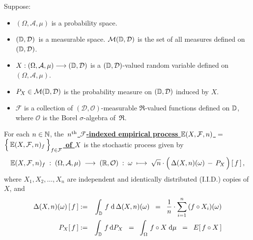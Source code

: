 \begin{definition}
\mbox{}\vskip 0.1cm
\noindent
Suppose:
\begin{itemize}
\item
	$(\Omega,\mathcal{A},\mu)$ is a probability space.
\item
	$(\mathbb{D},\mathcal{D})$\, is a measurable space.
	$\mathcal{M}(\mathbb{D},\mathcal{D})$ is the set of all measures defined on $(\mathbb{D},\mathcal{D})$.
\item
	$X : (\Omega,\mathcal{A},\mu) \longrightarrow (\mathbb{D},\mathcal{D})$
	is a $(\mathbb{D},\mathcal{D})$-valued random variable defined on
	$(\Omega,\mathcal{A},\mu)$.
\item
	$P_{X} \in \mathcal{M}(\mathbb{D},\mathcal{D})$ is the probability measure
	on $(\mathbb{D},\mathcal{D})$ induced by $X$.
\item
	$\mathcal{F}$ is a collection of $(\mathcal{D},\mathcal{O})$-measurable $\Re$-valued functions
	defined on $\mathbb{D}$, where $\mathcal{O}$ is the Borel $\sigma$-algebra of \,$\Re$.
\end{itemize}
For each $n\in\mathbb{N}$, the
\,\underline{\textbf{$n^{\textnormal{th}}$ $\mathcal{F}$-indexed empirical process
	$\mathbb{E}(X,\mathcal{F},n)$ $=$
	$\left\{\,\overset{{\color{white}.}}{\E}(X,\mathcal{F},n)_{f}\,\right\}_{f\in\mathcal{F}}$ of $X$}}\,
is the stochastic process given by
\begin{equation*}
\E(X,\mathcal{F},n)_{f}
\; : \; (\Omega,\mathcal{A},\mu) \;\longrightarrow\; (\Re,\mathcal{O})
\; : \; \omega \;\longmapsto\;
	\sqrt{n}\cdot
	\left(\,\Delta(X,n)(\omega) \,\overset{{\color{white}.}}{-}\, P_{X}\,\right)[\,f\,]\,,
\end{equation*}
where $X_{1}, X_{2}, \ldots, X_{n}$ are independent and identically distributed (I.I.D.) copies of $X$,
and
\begin{eqnarray*}
\Delta(X,n)(\omega)\left[\,f\,\right]
&:=&
	\int_{\mathbb{D}}\, f \;\textnormal{d}\,\Delta(X,n)(\omega)
\;\; = \;\;
	\dfrac{1}{n}\cdot
	\overset{n}{\underset{i=1}{\sum}}\,(f \circ X_{i})(\omega) 
\\
P_{X}\!\left[\,f\,\right]
& := &
	\int_{\mathbb{D}}\,f\,\textnormal{d} P_{X}
\;\; = \;\;
	\int_{\Omega}\,f \circ X \;\textnormal{d}\mu
\;\; = \;\;
	E\!\left[\,f \circ X\,\right]
\end{eqnarray*}
\end{definition}


